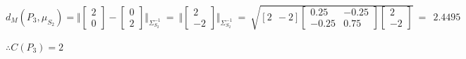 \documentclass[letterpaper]{article}
\begin{document}
\begin{enumerate}
\begin{enumerate}
	$ d_{M}(P_3 , \mu_{S_2}) = \Vert \begin{bmatrix} 2 \\ 0\end{bmatrix} - \begin{bmatrix} 0 \\ 2\end{bmatrix} \Vert_{\Sigma^{-1}_{S_2}} ~=~ \Vert \begin{bmatrix} 2 \\ -2\end{bmatrix} \Vert_{\Sigma^{-1}_{S_2}} ~=
	~ \sqrt{[2 ~~ -2] \begin{bmatrix}0.25 & -0.25 \\ -0.25 & 0.75\end{bmatrix} \begin{bmatrix} 2 \\ -2 \end{bmatrix}} ~=~~ 2.4495$	\\ \vskip 1mm
	
	$\therefore C(P_3) = 2$
	
\end{enumerate}

\end{enumerate}
\end{document}
